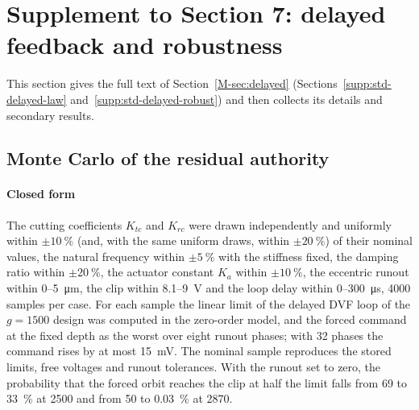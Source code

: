 \section{Supplement to Section 7: delayed feedback and robustness}\label{supp:delayed}

This section gives the full text of Section~\ref{M-sec:delayed} (Sections~\ref{supp:std-delayed-law} and~\ref{supp:std-delayed-robust}) and then collects its details and secondary results.



\subsection{Monte Carlo of the residual authority}\label{supp:mc}

\paragraph{Closed form} The cutting coefficients $K_{tc}$ and $K_{rc}$ were drawn independently and uniformly within $\pm\SI{10}{\percent}$ (and, with the same uniform draws, within $\pm\SI{20}{\percent}$) of their nominal values, the natural frequency within $\pm\SI{5}{\percent}$ with the stiffness fixed, the damping ratio within $\pm\SI{20}{\percent}$, the actuator constant $K_a$ within $\pm\SI{10}{\percent}$, the eccentric runout within 0--\SI{5}{\micro\metre}, the clip within 8.1--\SI{9}{\volt} and the loop delay within 0--\SI{300}{\micro\second}, 4000 samples per case. For each sample the linear limit of the delayed DVF loop of the $g=1500$ design was computed in the zero-order model, and the forced command at the fixed depth as the worst over eight runout phases; with 32 phases the command rises by at most \SI{15}{\milli\volt}. The nominal sample reproduces the stored limits, free voltages and runout tolerances. With the runout set to zero, the probability that the forced orbit reaches the clip at half the limit falls from 69 to \SI{33}{\percent} at \SI{2500}{\rpm} and from 50 to \SI{0.03}{\percent} at \SI{2870}{\rpm}.

